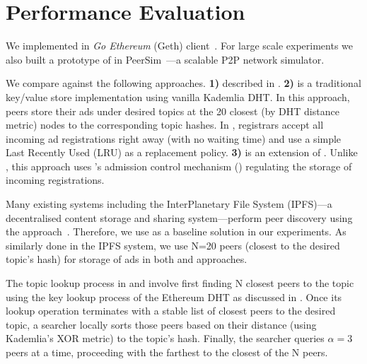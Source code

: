 
\section{Performance Evaluation}
\label{sec:eval}
We implemented \sysname in \emph{Go Ethereum} (Geth) client~\cite{geth}. 
For large scale experiments we also built a prototype of \sysname in PeerSim~\cite{p2p09-peersim}---a scalable P2P network simulator. %

We compare \sysname against the following approaches. \textbf{1) \discv} described in . \textbf{2) \altname} is a traditional key/value store implementation using vanilla Kademlia DHT.  In this approach, peers store their ads under desired topics at the 20 closest (by DHT distance metric) nodes to the corresponding topic hashes. In \altname, registrars accept all incoming ad registrations right away (\ie with no waiting time) and use a simple Last Recently Used (LRU) as a replacement policy. \textbf{3) \altnameticket} is an extension of \altname. Unlike \altname, this approach uses \sysname's admission control mechanism () regulating the storage of incoming registrations. 


Many existing systems including the InterPlanetary File System (IPFS)---a decentralised content storage and sharing system---perform peer discovery using the \altname approach~\cite{libp2p_kaddht}. Therefore, we use \altname as a baseline solution in our experiments. 
As similarly done in the IPFS system, we use N=20 peers (\ie closest to the desired topic's hash) for storage of ads in both \altname and \altnameticket approaches.

The topic lookup process in \altname and \altnameticket involve first finding N closest peers to the topic using the key lookup process of the Ethereum DHT as discussed in . Once its lookup operation terminates with a stable list of closest peers to the desired topic, a searcher locally sorts those peers based on their distance (using Kademlia's XOR metric) to the topic's hash. Finally, the searcher queries $\alpha=3$ peers at a time, proceeding with the farthest to the closest of the N peers.


